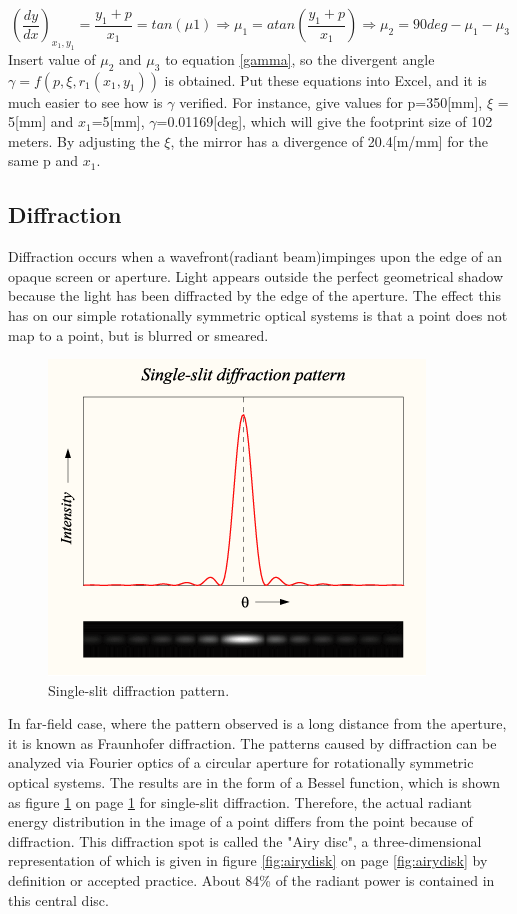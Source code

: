 \begin{equation}
\label{miu2}
(\frac{dy}{dx})_{x_{1},y_{1}} = \frac{y_{1}+p}{x_{1}} = tan(\mu{1})\Rightarrow \mu_{1} = atan(\frac{y_{1}+p}{x_{1}}) \Rightarrow \mu_{2} = 90deg - \mu_{1} - \mu_{3}
\end {equation}
Insert value of $\mu_{2}$ and $\mu_{3}$ to equation \ref{gamma}, so the divergent angle $\gamma = f(p, \xi, r_{1}(x_{1}, y_{1}))$ is obtained. Put these equations into Excel, and it is much easier to see how is $\gamma$ verified. For instance, give values for p=350[mm], $\xi$ = 5[mm] and $x_{1}$=5[mm], $\gamma$=0.01169[deg], which will give the footprint size of 102 meters. By adjusting the $\xi$, the mirror has a divergence of 20.4[m/mm] for the same p and $x_{1}$.

\subsection{Diffraction}
\label{diff}
Diffraction occurs when a wavefront(radiant beam)impinges upon the edge of an opaque screen or aperture. Light appears outside the perfect geometrical shadow because the light has been diffracted by the edge of the aperture. The effect this has on our simple rotationally symmetric optical systems is that a point does not map to a point, but is blurred or smeared. 

\begin{figure}[ht!]
\centering
\includegraphics[scale = 0.8]{chapters/img/diffraction_singleslit.png}
\caption{Single-slit diffraction pattern.}
\label{fig:single_slit}
\end{figure}

In far-field case, where the pattern observed is a long distance from the aperture, it is known as Fraunhofer diffraction. The patterns caused by diffraction can be analyzed via Fourier optics of a circular aperture for rotationally symmetric optical systems. The results are in the form of a Bessel function, which is shown as figure \ref{fig:single_slit} on page \ref{fig:single_slit} for single-slit diffraction. Therefore, the actual radiant energy distribution in the image of a point differs from the point because of diffraction. This diffraction spot is called the "Airy disc", a three-dimensional representation of which is given in figure \ref{fig:airydisk} on page \ref{fig:airydisk} by definition or accepted practice. About 84\% of the radiant power is contained in this central disc.

